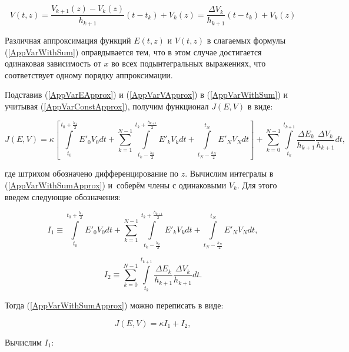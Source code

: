 \begin{equation}\label{AppVarVApprox}
V(t, z) = \frac{V_{k+1}(z) - V_k(z)}{h_{k+1}}(t - t_k) + V_k(z) = \frac{\Delta V_k}{h_{k+1}}(t - t_k) + V_k(z)
\end{equation}

Различная аппроксимация функций $E(t, z)$ и $V(t, z)$ в слагаемых формулы (\ref{AppVarWithSum}) оправдывается тем,
что в этом случае достигается одинаковая зависимость от $x$ во всех подынтегральных выражениях, что соответствует
одному порядку аппроксимации.

Подставив (\ref{AppVarEApprox}) и (\ref{AppVarVApprox}) в (\ref{AppVarWithSum}) и учитывая (\ref{AppVarConstApprox}),
получим функционал $J(E, V)$ в виде:

\begin{equation}\label{AppVarWithSumApprox}
J(E, V) = \kappa \left[ \int\limits_{t_0}^{t_0+\frac{h_1}{2}} E'_0 V_0 dt +
          \sum\limits_{k=1}^{N-1} \int\limits_{t_k-\frac{h_k}{2}}^{t_k+\frac{h_{k+1}}{2}} E'_k V_k dt +
          \int\limits_{t_N-\frac{h_N}{2}}^{t_N} E'_N V_N dt \right] +
          \sum\limits_{k=0}^{N-1} \int\limits_{t_k}^{t_{k+1}} \frac{\Delta E_k}{h_{k+1}} \frac{\Delta V_k}{h_{k+1}} dt,
\end{equation}

\noindent где штрихом обозначено дифференцирование по $z$. Вычислим интегралы в (\ref{AppVarWithSumApprox}) и~соберём члены с одинаковыми $V_k$.
Для этого введем следующие обозначения:

\begin{equation}\label{AppVarI1}
I_1 \equiv \int\limits_{t_0}^{t_0+\frac{h_1}{2}} E'_0 V_0 dt +
          \sum\limits_{k=1}^{N-1} \int\limits_{t_k-\frac{h_k}{2}}^{t_k+\frac{h_{k+1}}{2}} E'_k V_k dt +
          \int\limits_{t_N-\frac{h_N}{2}}^{t_N} E'_N V_N dt,
\end{equation}

\begin{equation}\label{AppVarI2}
I_2 \equiv \sum\limits_{k=0}^{N-1} \int\limits_{t_k}^{t_{k+1}} \frac{\Delta E_k}{h_{k+1}} \frac{\Delta V_k}{h_{k+1}} dt.
\end{equation}

Тогда (\ref{AppVarWithSumApprox}) можно переписать в виде:

\begin{equation}\label{AppVarI1I2}
J(E, V) = \kappa I_1 + I_2,
\end{equation}

Вычислим $I_1$:

